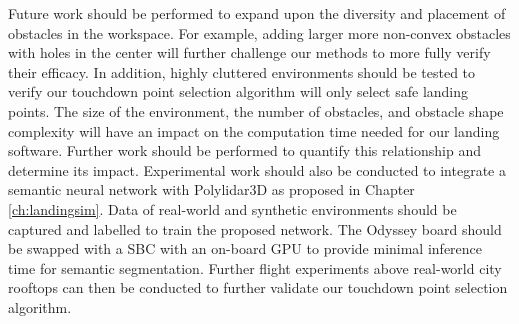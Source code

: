 Future work should be performed to expand upon the diversity and placement of obstacles in the workspace.  For example, adding larger more non-convex obstacles with holes in the center will further challenge our methods to more fully verify their efficacy. In addition, highly cluttered environments should be tested to verify our touchdown point selection algorithm will only select safe landing points. The size of the environment, the number of obstacles, and obstacle shape complexity will have an impact on the computation time needed for our landing software. Further work should be performed to quantify this relationship and determine its impact.  Experimental work should also be conducted to integrate a semantic neural network with Polylidar3D as proposed in Chapter \ref{ch:landingsim}. Data of real-world and synthetic environments should be captured and labelled to train the proposed network. The Odyssey board should be swapped with a \ac{SBC} with an on-board \ac{GPU} to provide minimal inference time for semantic segmentation. Further flight experiments above real-world city rooftops can then be conducted to further validate our touchdown point selection algorithm.